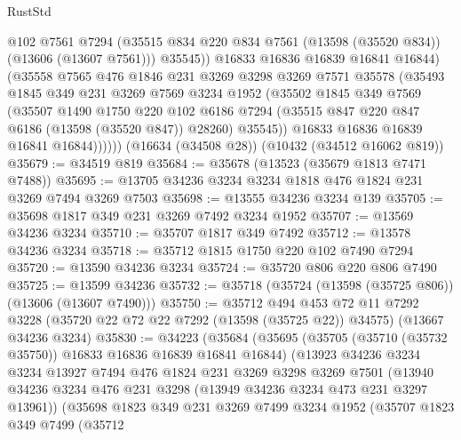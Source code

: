 \begin{lexlean}{RustStd}
\begin{coremodule}
                  @102
                  @7561
                  @7294
                  (@35515 @834 @220 @834 @7561 (@13598 (@35520 @834)) (@13606 (@13607 @7561)))
                  @35545))
              @16833
              @16836
              @16839
              @16841
              @16844)
            (@35558
              @7565
              @476
              @1846
              @231
              @3269
              @3298
              @3269
              @7571
              @35578
              (@35493
                @1845
                @349
                @231
                @3269
                @7569
                @3234
                @1952
                (@35502
                  @1845
                  @349
                  @7569
                  (@35507
                    @1490
                    @1750
                    @220
                    @102
                    @6186
                    @7294
                    (@35515 @847 @220 @847 @6186 (@13598 (@35520 @847)) @28260)
                    @35545))
                @16833
                @16836
                @16839
                @16841
                @16844))))))
    (@16634 (@34508 @28))
    (@10432 (@34512 @16062 @819))
@35679 := @34519 @819
@35684 := @35678 (@13523 (@35679 @1813 @7471 @7488))
@35695 := @13705 @34236 @3234 @3234 @1818 @476 @1824 @231 @3269 @7494 @3269 @7503
@35698 := @13555 @34236 @3234 @139
@35705 := @35698 @1817 @349 @231 @3269 @7492 @3234 @1952
@35707 := @13569 @34236 @3234
@35710 := @35707 @1817 @349 @7492
@35712 := @13578 @34236 @3234
@35718 := @35712 @1815 @1750 @220 @102 @7490 @7294
@35720 := @13590 @34236 @3234
@35724 := @35720 @806 @220 @806 @7490
@35725 := @13599 @34236
@35732 := @35718 (@35724 (@13598 (@35725 @806)) (@13606 (@13607 @7490)))
@35750 := @35712
    @494
    @453
    @72
    @11
    @7292
    @3228
    (@35720 @22 @72 @22 @7292 (@13598 (@35725 @22)) @34575)
    (@13667 @34236 @3234)
@35830 := @34223
    (@35684
      (@35695
        (@35705 (@35710 (@35732 @35750)) @16833 @16836 @16839 @16841 @16844)
        (@13923
          @34236
          @3234
          @3234
          @13927
          @7494
          @476
          @1824
          @231
          @3269
          @3298
          @3269
          @7501
          (@13940 @34236 @3234 @476 @231 @3298 (@13949 @34236 @3234 @473 @231 @3297 @13961))
          (@35698
            @1823
            @349
            @231
            @3269
            @7499
            @3234
            @1952
            (@35707
              @1823
              @349
              @7499
              (@35712

\end{coremodule}
\end{lexlean}
